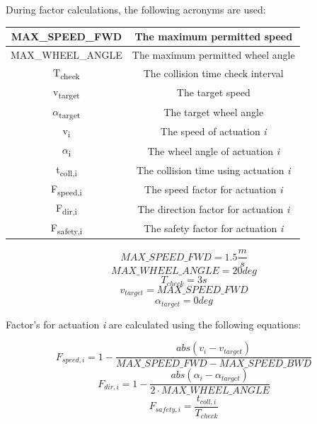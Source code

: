 \begin{minipage}{\textwidth}
During factor calculations, the following acronyms are used:

\begin{center}
    \begin{tabular}{ | c | c | }
        \hline
        MAX\_SPEED\_FWD					& The maximum permitted speed 						\\
        \hline
        MAX\_WHEEL\_ANGLE				& The maximum permitted wheel angle 				\\
        \hline
        T\textsubscript{check}  		& The collision time check interval      			\\
        \hline
        v\textsubscript{target}			& The target speed 									\\
        \hline
        $\alpha$\textsubscript{target}  & The target wheel angle      						\\
        \hline
        v\textsubscript{i}  			& The speed of actuation \textit{i}					\\
        \hline
        $\alpha$\textsubscript{i}  		& The wheel angle of actuation \textit{i}			\\
        \hline
        t\textsubscript{coll,i}  		& The collision time using actuation \textit{i}		\\
        \hline
        F\textsubscript{speed,i}  		& The speed factor for actuation \textit{i}			\\
        \hline
        F\textsubscript{dir,i}  		& The direction factor for actuation \textit{i}		\\
        \hline
        F\textsubscript{safety,i}  		& The safety factor for actuation \textit{i}		\\
        \hline
    \end{tabular}
\end{center}
\end{minipage}

\begin{minipage}{\textwidth}
\[ MAX\_SPEED\_FWD = 1.5 \frac{m}{s} \]
\[ MAX\_WHEEL\_ANGLE = 20 deg \]
\[ T_{check} = 3 s \]
\[ v_{target} = MAX\_SPEED\_FWD \]
\[ \alpha_{target} = 0 deg \]
\end{minipage}

\begin{minipage}{\textwidth}
Factor's for actuation \textit{i} are calculated using the following equations:

\[ F_{speed,i} = 1 - \frac{abs(v_{i} - v_{target})}{MAX\_SPEED\_FWD - MAX\_SPEED\_BWD} \]
\[ F_{dir,i} = 1 - \frac{abs(\alpha_{i} - \alpha_{target})}{2 \cdot MAX\_WHEEL\_ANGLE} \]
\[ F_{safety,i} = \frac{t_{coll,i}}{T_{check}} \]
\end{minipage}

